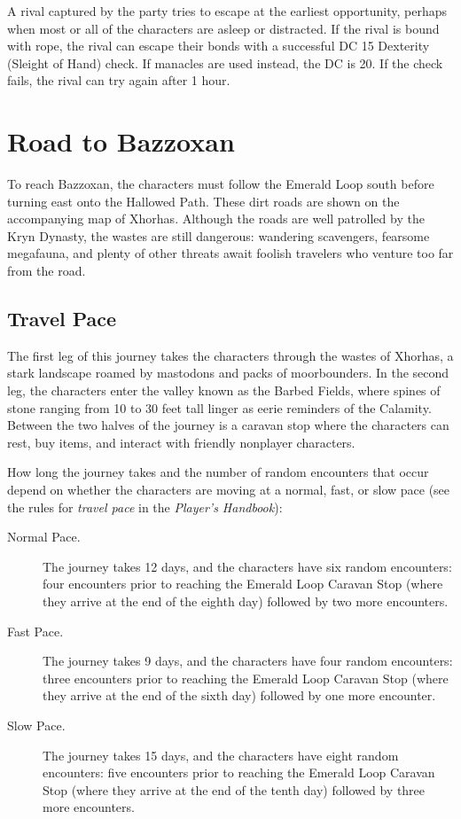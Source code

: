 \documentclass[10pt,a4paper,twoside,fancy,bg=print,twocolumn,openany,nodeprecatedcode]{dndbook}
\begin{document}
A rival captured by the party tries to escape at the earliest opportunity, perhaps when most or all of the characters are asleep or distracted. If the rival is bound with rope, the rival can escape their bonds with a successful DC 15 Dexterity (Sleight of Hand) check. If manacles are used instead, the DC is 20. If the check fails, the rival can try again after 1 hour.

\section{Road to Bazzoxan}
To reach Bazzoxan, the characters must follow the Emerald Loop south before turning east onto the Hallowed Path. These dirt roads are shown on the accompanying map of Xhorhas. Although the roads are well patrolled by the Kryn Dynasty, the wastes are still dangerous: wandering scavengers, fearsome megafauna, and plenty of other threats await foolish travelers who venture too far from the road.

\subsection{Travel Pace}
The first leg of this journey takes the characters through the wastes of Xhorhas, a stark landscape roamed by mastodons and packs of moorbounders. In the second leg, the characters enter the valley known as the Barbed Fields, where spines of stone ranging from 10 to 30 feet tall linger as eerie reminders of the Calamity. Between the two halves of the journey is a caravan stop where the characters can rest, buy items, and interact with friendly nonplayer characters.

How long the journey takes and the number of random encounters that occur depend on whether the characters are moving at a normal, fast, or slow pace (see the rules for \textit{travel pace} in the \textit{Player's Handbook}):


\begin{description}
\item[Normal Pace.]
The journey takes 12 days, and the characters have six random encounters: four encounters prior to reaching the Emerald Loop Caravan Stop (where they arrive at the end of the eighth day) followed by two more encounters.
\item[Fast Pace.]
The journey takes 9 days, and the characters have four random encounters: three encounters prior to reaching the Emerald Loop Caravan Stop (where they arrive at the end of the sixth day) followed by one more encounter.
\item[Slow Pace.]
The journey takes 15 days, and the characters have eight random encounters: five encounters prior to reaching the Emerald Loop Caravan Stop (where they arrive at the end of the tenth day) followed by three more encounters.
\end{description}
\end{document}
